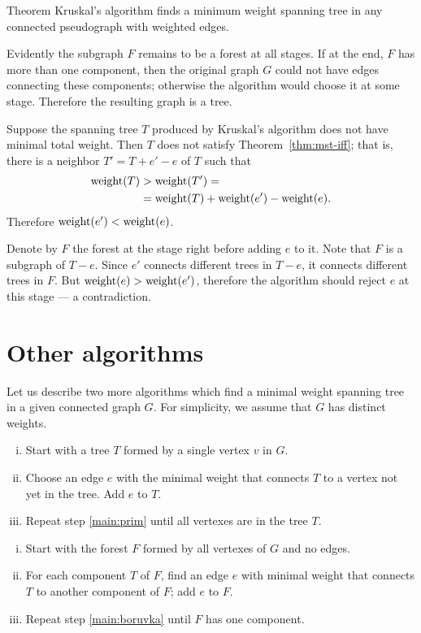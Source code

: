 \begin{thm}{Theorem}\label{thm:kruskal}
Kruskal’s algorithm finds a minimum weight spanning tree in any connected pseudograph with weighted edges.
\end{thm}

Evidently the subgraph $F$ remains to be a forest at all stages.
If at the end, $F$ has more than one component, then the original graph $G$ could not have edges connecting these components;
otherwise the algorithm would choose it at some stage.
Therefore the resulting graph is a tree.

Suppose the spanning tree $T$ produced by Kruskal’s algorithm does not have minimal total weight.
Then $T$ does not satisfy Theorem~\ref{thm:mst-iff};
that is, there is a neighbor $T'=T+e'-e$ of $T$ such that 
\begin{align*}
\mathop{\rm weight}\nolimits(T)&>\mathop{\rm weight}\nolimits(T')=
\\
&=\mathop{\rm weight}\nolimits(T)+\mathop{\rm weight}\nolimits(e')-\mathop{\rm weight}\nolimits(e).
\end{align*}
Therefore $\mathop{\rm weight}\nolimits(e')<\mathop{\rm weight}\nolimits(e)$.

Denote by $F$ the forest at the stage right before adding $e$ to it.
Note that $F$ is a subgraph of $T-e$.
Since $e'$ connects different trees in $T-e$,
it connects different trees in $F$.
But $\mathop{\rm weight}\nolimits(e)>\mathop{\rm weight}\nolimits(e')$, therefore the algorithm should reject $e$ at this stage --- a contradiction.
\qeds

\section*{Other algorithms}

Let us describe two more algorithms which find  a minimal weight spanning tree in a given connected graph $G$.
For simplicity, we assume that $G$ has distinct weights.

\begin{enumerate}[(i)]
\item Start with a tree $T$ formed by a single vertex $v$ in $G$.
\item\label{main:prim} Choose an edge $e$ with the minimal weight that connects $T$ to a vertex not yet in the tree.
Add $e$ to $T$.
\item Repeat step \ref{main:prim} until all vertexes are in the tree $T$.
\end{enumerate}

\begin{enumerate}[(i)]
\item Start with the forest $F$ formed by all vertexes of $G$ and no edges.
\item\label{main:boruvka} For each component $T$ of $F$, find an edge $e$ with minimal weight that connects $T$ to another component of $F$; add $e$ to $F$.
\item Repeat step \ref{main:boruvka} until $F$ has one component. 
\end{enumerate}


